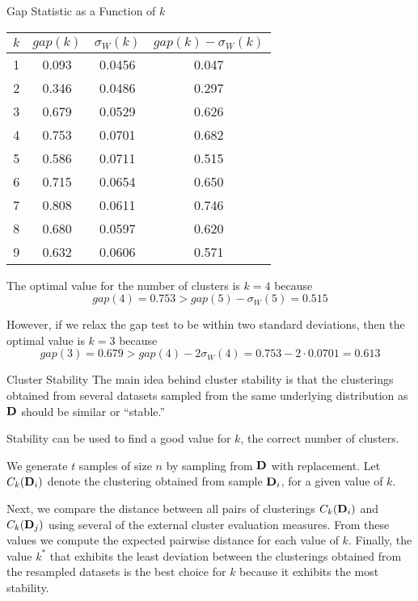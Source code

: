 \begin{frame}{Gap Statistic as a Function of $\textit{k}$}
\renewcommand{\arraystretch}{1.1} 
\begin{center}
\begin{tabular}{|c|ccc|}
    \hline
$k$ &  $gap(k)$ & $\sigma_W(k)$ & $gap(k)-\sigma_W(k)$\\
\hline
1 &  0.093 &0.0456 &0.047\\
2 &  0.346 &0.0486 &0.297\\
3 &  0.679 &0.0529 &0.626\\
4 &  0.753 &0.0701 &0.682\\
5 &  0.586 &0.0711 &0.515\\
6 &  0.715 &0.0654 &0.650\\
7 &  0.808 &0.0611 &0.746\\
8 &  0.680 &0.0597 &0.620\\
9 &  0.632 &0.0606 &0.571\\
\hline
  \end{tabular}%
\end{center}
The optimal value for the number of clusters is
$k=4$ because
$$gap(4) = 0.753 > gap(5)-\sigma_W(5) = 0.515$$

\medskip
However, if we
relax the gap test to be within two standard deviations, then the
optimal value is $k=3$ because
$$gap(3) = 0.679 >
gap(4)-2\sigma_W(4) = 0.753-2\cdot0.0701 = 0.613$$
\end{frame}



\begin{frame}{Cluster Stability}
The main idea behind cluster stability is that the clusterings obtained
from several datasets sampled from the same underlying distribution as
$\mathbf{D}$ should be similar or ``stable.''

\medskip
Stability can be
used to f\/{i}nd  a good value for
$k$, the correct number of clusters.

\medskip
We generate $t$ samples of size $n$ by sampling from $\mathbf{D}$
with replacement.
Let ${\relax C}_k(\mathbf{D}_i)$ denote the
clustering obtained from sample $\mathbf{D}_i$, for a given value of $k$. 

\medskip
Next,
we compare the distance between all pairs of clusterings
${\relax C}_k(\mathbf{D}_i)$ and ${\relax C}_k(\mathbf{D}_{j})$ using several 
of the external cluster evaluation measures.
From these values we compute the
expected pairwise distance for each value of $k$.  F{i}nally, the value
$k^*$ that exhibits the least deviation between the clusterings obtained
from the resampled datasets is the best choice for $k$ because it
exhibits the most stability.
\end{frame}



